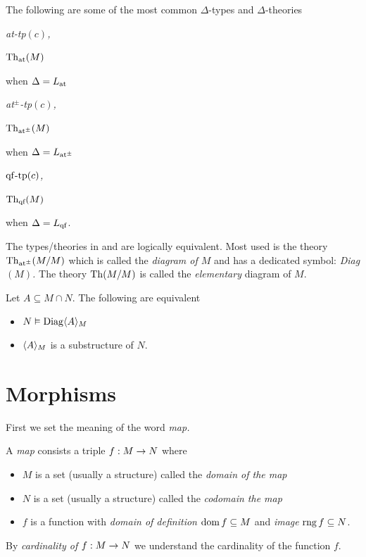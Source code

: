 \begin{notation}\label{note_tipi_diagramma}
The following are some of the most common $\Delta$-types and $\Delta$-theories
\def\ceq#1#2{\parbox[b]{15ex}{#1}\parbox[b]{14ex}{\hfill #2}}

\ceq{\hfill\emph{\textrm{at-tp}$(c)$,}}{\emph{${\rm Th}_{\textrm{\scriptsize at}}(M)$\/}}\qquad when $\Delta=L_{\rm at}$

\ceq{\hfill\emph{\textrm{at$^\pm$-tp}$(c)$,}}{\emph{${\rm Th}_{\textrm{\scriptsize at}^\pm}(M)$\/}}\qquad when $\Delta=L_{\rm at^{\scriptscriptstyle\pm}}$

\ceq{\hfill\emph{${\rm qf\mbox{-}tp}(c)$,}}{\emph{${\rm Th}_{\textrm{\scriptsize qf}}(M)$\/}}\qquad when $\Delta=L_{\rm qf}$.

The types/theories in  and  are logically equivalent.
Most used is the theory ${\rm Th}_{\textrm{\scriptsize at}^\pm}(M/M)$ which is called the \emph{diagram of $M$\/} and has a dedicated symbol: \emph{Diag$(M)$.}
The theory ${\rm Th}(M/M)$ is called the \emph{elementary\/} diagram of $M$.
\end{notation}

\begin{remark}\label{rem_diagram}
Let $A\subseteq M\cap N$.
The following are equivalent
\begin{itemize}
\item[1.] $N\vDash{\rm Diag}\langle A\rangle_M$
\item[2.] $\langle A\rangle_M$ is a substructure of $N$.
\end{itemize}
\end{remark}


\section{Morphisms}
\label{morphisms}

\def\ceq#1#2#3{\parbox[b]{15ex}{$\displaystyle #1$}\parbox[b]{6ex}{\hfil$#2$}$\displaystyle #3$}

First we set the meaning of the word \emph{map.}

\begin{definition}\label{defmappa}
A \emph{map\/} consists a triple $f:M\rightarrow N$ where
\begin{itemize}
\item[1.] $M$ is a set (usually a structure) called the \emph{domain of the map}
\item[2.] $N$ is a set (usually a structure) called the \emph{codomain the map}
\item[3.] $f$ is a function with \emph{domain of definition\/} $\mathop{\rm dom} f\subseteq M$ and \emph{image} $\mathop{\rm rng} f\subseteq N$.
\end{itemize}
\smallskip
By \emph{cardinality of $f:M\rightarrow N$\/} we understand the cardinality of the function $f$.
\end{definition}

